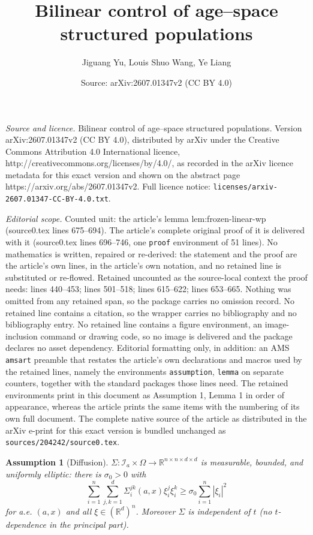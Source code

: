\documentclass[10pt,a4paper]{amsart}
\title{Bilinear control of age--space structured populations}
\author{Jiguang Yu, Louis Shuo Wang, Ye Liang}
\date{Source: arXiv:2607.01347v2 (CC BY 4.0)}
\newtheorem{assumption}{Assumption}
\newcommand{\R}{\mathbb R}
\begin{document}
\maketitle

\noindent\emph{Source and licence.} Bilinear control of age--space structured populations. Version arXiv:2607.01347v2 (CC BY 4.0), distributed by arXiv under the Creative Commons Attribution 4.0 International licence, http://creativecommons.org/licenses/by/4.0/, as recorded in the arXiv licence metadata for this exact version and shown on the abstract page https://arxiv.org/abs/2607.01347v2. Full licence notice: \texttt{licenses/arxiv-2607.01347-CC-BY-4.0.txt}.\par\smallskip

\noindent\textit{Editorial scope.} Counted unit: the article's lemma lem:frozen-linear-wp (source0.tex lines 675--694). The article's complete original proof of it is delivered with it (source0.tex lines 696--746, one \texttt{proof} environment of 51 lines). No mathematics is written, repaired or re-derived: the statement and the proof are the article's own lines, in the article's own notation, and no retained line is substituted or re-flowed.  Retained uncounted as the source-local context the proof needs: lines 440--453; lines 501--518; lines 615--622; lines 653--665.  Nothing was omitted from any retained span, so the package carries no omission record.  No retained line contains a citation, so the wrapper carries no bibliography and no bibliography entry.  No retained line contains a figure environment, an image-inclusion command or drawing code, so no image is delivered and the package declares no asset dependency.  Editorial formatting only, in addition: an AMS \texttt{amsart} preamble that restates the article's own declarations and macros used by the retained lines, namely the environments \texttt{assumption}, \texttt{lemma} on separate counters, together with the standard packages those lines need.  The retained environments print in this document as Assumption 1, Lemma 1 in order of appearance, whereas the article prints the same items with the numbering of its own full document.  The complete native source of the article as distributed in the arXiv e-print for this exact version is bundled unchanged as \texttt{sources/204242/source0.tex}.
\begin{assumption}[Diffusion]
\label{ass:diffusion}
$\Sigma: \mathcal I_a\times\Omega\to\R^{n\times n\times d\times d}$ is measurable,
bounded, and uniformly elliptic: there is $\sigma_0>0$ with
\[
\sum_{i=1}^n\sum_{j,k=1}^d
\Sigma_i^{jk}(a,x)\xi_i^j\xi_i^k
\ge
\sigma_0
\sum_{i=1}^n|\xi_i|^2
\]
for a.e. $(a,x)$ and all $\xi\in(\R^d)^n$. Moreover $\Sigma$ is independent of
$t$ (no $t$-dependence in the principal part).
\end{assumption}
\end{document}
